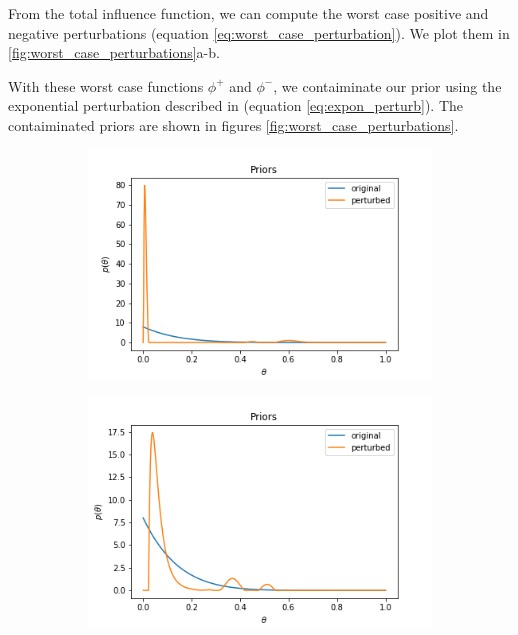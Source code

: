 \documentclass[a4paper]{article}
\begin{document}
From the total influence function, we can compute the worst case positive and negative
perturbations (equation \ref{eq:worst_case_perturbation}).
We plot them in \ref{fig:worst_case_perturbations}a-b.

With these worst case functions $\phi^+$ and $\phi^-$, we contaiminate our prior
using the exponential perturbation described in (equation \ref{eq:expon_perturb}).
The contaiminated priors are shown in figures \ref{fig:worst_case_perturbations}.

\begin{figure}[h!]
	\centering
\begin{subfigure}[t]{0.4\textwidth}
  \includegraphics[width = \textwidth]{./func_sens_results/worst_case_neg_priors.png}
  \subcaption{}
\end{subfigure}
\begin{subfigure}[t]{0.4\textwidth}
  \includegraphics[width = \textwidth]{./func_sens_results/worst_case_pos_priors.png}

\end{subfigure}
\end{figure}
\end{document}
